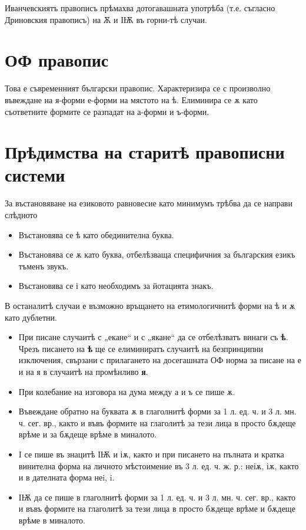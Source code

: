 \documentclass{article}
\begin{document}
	Иванчевскиятъ правописъ прѣмахва дотогавашната употрѣба (т.е. съгласно Дриновския правописъ) на Ѫ и ІѬ въ горни-тѣ случаи.
	
	\section{ОФ правопис}

	Това е съвременният български правопис. 
	Характеризира се с произволно въвеждане на я-форми е-форми на мястото на ѣ.
	Елиминира се ѫ като съответните формите се разпадат  на а-форми и ъ-форми.

	\section{Прѣдимства на старитѣ правописни системи}
	
	За въстановяване на езиковото равновесие като минимумъ трѣбва да се направи слѣдното 
	
	\begin{itemize}
			\item Въстановява се ѣ като обединителна буква. 
			\item Въстановява се ѫ като буква, отбелѣзваща специфичния за българския езикъ тъменъ звукъ.
			\item Въстановява се і като необходимъ за йотацията знакъ.
	\end{itemize}
	В останалитѣ случаи е възможно връщането на етимологичнитѣ форми на ѣ и ѫ като дублетни.
	
	\begin{itemize}
		
	\item При писане случаитѣ с „екане“ и с „якане“ да се отбелѣзватъ винаги съ \textbf{ѣ}. Чрезъ писането на \textbf{ѣ} ще се елиминиратъ случаитѣ на безпринципни изключения, свързани с прилагането на досегашната ОФ норма за писане на е и на я в случаитѣ на промѣнливо \textbf{я}.
	
 	\item При колебание на изговора на дума между а и ъ се пише ѫ.
	
 	\item Въвеждане обратно на буквата ѫ  в глаголнитѣ форми за 1 л. ед. ч. и 3 л. мн. ч. сег. вр., както и въвъ формите на глаголитѣ за тези лица в просто бѫдеще врѣме и за бѫдеще врѣме в миналото.
 	
	\item I се пише въ знацитѣ ІѬ и іѫ, както и при писането на пълната и кратка винителна форма на личното мѣстоимение въ 3 л. ед. ч. ж. р.: неіѫ, іѫ, както и в дателната форма неi, i.
 	
 	\item ІѬ да се пише в глаголнитѣ форми за 1 л. ед. ч. и 3 л. мн. ч. сег. вр., както и въвъ формите на глаголитѣ за тези лица в просто бѫдеще врѣме и бѫдеще врѣме в миналото.
 	
 	
 	
	\end{itemize}

	
\end{document}
